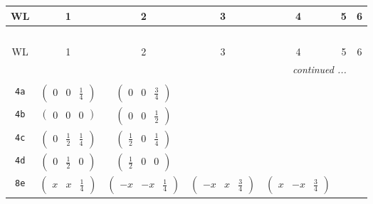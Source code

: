 \documentclass[fleqn,9pt,landscape]{jsarticle}
\begin{document}
\begin{center}
\renewcommand{\arraystretch}{1.2}
\begin{longtable}{ccccccc}
 \hline \hline
WL & 1 & 2 & 3 & 4 & 5 & 6 \\ \hline \endfirsthead

\multicolumn{6}{l}{\tablename\ \thetable{}} \\
 \hline \hline
WL & 1 & 2 & 3 & 4 & 5 & 6 \\ \hline \endhead

 \hline \hline
\multicolumn{6}{r}{\footnotesize\it continued ...} \\ \endfoot

 \hline \hline
\multicolumn{6}{r}{} \\ \endlastfoot

{\tt 4a} & $ \begin{pmatrix} 0 & 0 & \frac{1}{4} \end{pmatrix} $ & $ \begin{pmatrix} 0 & 0 & \frac{3}{4} \end{pmatrix} $ & $  $ & $  $ & $  $ & $  $ \\ \hline
{\tt 4b} & $ \begin{pmatrix} 0 & 0 & 0 \end{pmatrix} $ & $ \begin{pmatrix} 0 & 0 & \frac{1}{2} \end{pmatrix} $ & $  $ & $  $ & $  $ & $  $ \\ \hline
{\tt 4c} & $ \begin{pmatrix} 0 & \frac{1}{2} & \frac{1}{4} \end{pmatrix} $ & $ \begin{pmatrix} \frac{1}{2} & 0 & \frac{1}{4} \end{pmatrix} $ & $  $ & $  $ & $  $ & $  $ \\ \hline
{\tt 4d} & $ \begin{pmatrix} 0 & \frac{1}{2} & 0 \end{pmatrix} $ & $ \begin{pmatrix} \frac{1}{2} & 0 & 0 \end{pmatrix} $ & $  $ & $  $ & $  $ & $  $ \\ \hline
{\tt 8e} & $ \begin{pmatrix} x & x & \frac{1}{4} \end{pmatrix} $ & $ \begin{pmatrix} - x & - x & \frac{1}{4} \end{pmatrix} $ & $ \begin{pmatrix} - x & x & \frac{3}{4} \end{pmatrix} $ & $ \begin{pmatrix} x & - x & \frac{3}{4} \end{pmatrix} $ & $  $ & $  $ \\ \hline

\end{longtable}
\end{center}
\end{document}
